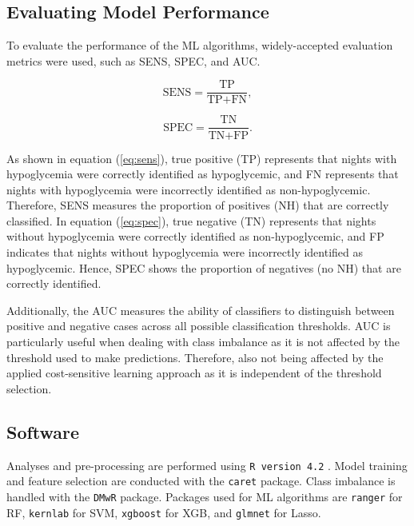 \subsection{Evaluating Model Performance} \label{Evaluating the Performance}
To evaluate the performance of the ML algorithms, widely-accepted evaluation metrics were used, such as SENS, SPEC, and AUC. 
    
\begin{center}
\begin{minipage}{0.25\textwidth}
\centering
\begin{equation}
\text{SENS} = \frac{\text{TP}}{\text{TP} + \text{FN}},
\label{eq:sens}
\end{equation}
\end{minipage}
\begin{minipage}{0.25\textwidth}
\centering
\begin{equation}
\text{SPEC} = \frac{\text{TN}}{\text{TN} + \text{FP}}.
\label{eq:spec}
\end{equation}
\end{minipage}
\end{center}

As shown in equation (\ref{eq:sens}), true positive (TP) represents that nights with hypoglycemia were correctly identified as hypoglycemic, and FN represents that nights with hypoglycemia were incorrectly identified as non-hypoglycemic. Therefore, SENS measures the proportion of positives (NH) that are correctly classified. In equation (\ref{eq:spec}), true negative (TN) represents that nights without hypoglycemia were correctly identified as non-hypoglycemic, and FP indicates that nights without hypoglycemia were incorrectly identified as hypoglycemic. Hence, SPEC shows the proportion of negatives (no NH) that are correctly identified.

Additionally, the AUC measures the ability of classifiers to distinguish between positive and negative cases across all possible classification thresholds. AUC is particularly useful when dealing with class imbalance as it is not affected by the threshold used to make predictions. Therefore, also not being affected by the applied cost-sensitive learning approach as it is independent of the threshold selection.

\subsection{Software} \label{Software}
Analyses and pre-processing are performed using \texttt{R version 4.2} \cite{team2020rstudio}. Model training and feature selection are conducted with the \texttt{caret} package. Class imbalance is handled with the \texttt{DMwR} package. Packages used for ML algorithms are \texttt{ranger} for RF, \texttt{kernlab} for SVM, \texttt{xgboost} for XGB, and \texttt{glmnet} for Lasso.